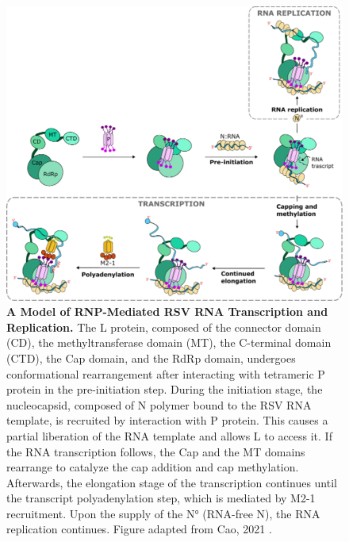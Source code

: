 \begin{figure}
    \centering
    \includegraphics[width=1\linewidth]{04. Introduction//Figs/09. N_p_l_m21-interaction-overview.pdf}  
    \caption[A Model of RNP-Mediated RSV RNA Transcription and Replication.]{\textbf{A Model of RNP-Mediated RSV RNA Transcription and Replication.} The L protein, composed of the connector domain (CD), the methyltransferase domain (MT), the C-terminal domain (CTD), the Cap domain, and the RdRp domain, undergoes conformational rearrangement after interacting with tetrameric P protein in the pre-initiation step. During the initiation stage, the nucleocapsid, composed of N polymer bound to the RSV RNA template, is recruited by interaction with P protein. This causes a partial liberation of the RNA template and allows L to access it. If the RNA transcription follows, the Cap and the MT domains rearrange to catalyze the cap addition and cap methylation. Afterwards, the elongation stage of the transcription continues until the transcript polyadenylation step, which is mediated by M2-1 recruitment. Upon the supply of the N° (RNA-free N), the RNA replication continues. Figure adapted from Cao, 2021 \cite{Cao2021StructuralComplexes}.}
    \label{fig:A Model of RNP-Mediated RSV RNA Transcription and Replication}
\end{figure}

